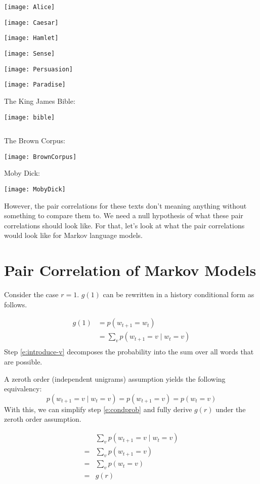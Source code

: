 \documentclass[11pt,letterpaper]{article}
\theoremstyle{definition}
\begin{document}
\texttt{[image: Alice]}

\texttt{[image: Caesar]}

\texttt{[image: Hamlet]}

\texttt{[image: Sense]}

\texttt{[image: Persuasion]}

\texttt{[image: Paradise]}

The King James Bible:

\texttt{[image: bible]}

\[\]
\[\]

The Brown Corpus:

\texttt{[image: BrownCorpus]}

Moby Dick:

\texttt{[image: MobyDick]}

However, the pair correlations for these texts don't meaning anything without something to compare them to. We need a null hypothesis of what these pair correlations should look like. For that, let's look at what the pair correlations would look like for Markov language models. 

\section{Pair Correlation of Markov Models}

Consider the case $r=1$.  $g(1)$ can be rewritten in a history conditional form as follows.

\begin{align}
g(1) &= p(w_{t+1}=w_{t}) \\
&= \sum_v p(w_{t+1}=v \mid w_{t}=v)  \label{e:introduce-v} \\
\end{align}
Step \ref{e:introduce-v} decomposes the probability into the sum over all words that are possible.  

A zeroth order (independent unigrams) assumption yields the following equivalency:
\[p(w_{t+1}=v \mid w_t=v) = p(w_{t+1}=v) = p(w_{t}=v)\]
With this, we can simplify step \ref{e:condprob} and fully derive $g(r)$ under the zeroth order assumption.

\begin{align}
&\sum_v p(w_{t+1}=v \mid w_t=v)\\
= &\sum_v p(w_{t+1}=v)\\
= &\sum_v p(w_{t}=v)  \\
= &g(r) 
\end{align}
\end{document}
